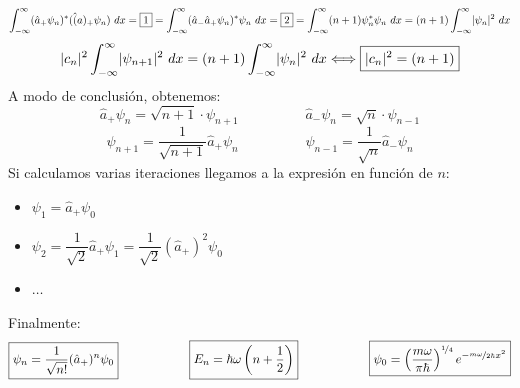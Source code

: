 \documentclass{report}
\begin{document}
      \[\int_{-\infty}^\infty (\hat{a}_+\psi_n)^*(\hat(a)_+\psi_n)\ dx=\boxed{1}=
      \int_{-\infty}^\infty (\hat{a}_-\hat{a}_+\psi_n)^*\psi_n\ dx=\boxed{2}=
      \int_{-\infty}^\infty (n+1)\psi_n^*\psi_n\ dx=(n+1)\int_{-\infty}^\infty \abs{\psi_n}^2\ dx\]
      \begin{equation}
        \lvert c_n\rvert^2\int_{-\infty}^\infty \lvert\psi_{n+1}\rvert^2\ dx=(n+1)\int_{-\infty}^{\infty}\lvert\psi_n\rvert^2\ dx \Longleftrightarrow \boxed{\lvert c_n\rvert^2=(n+1)}
      \end{equation}
      \noindent A modo de conclusión, obtenemos:
      \[\hat{a}_+\psi_n=\sqrt{n+1}\cdot\psi_{n+1}\hspace{2cm}\hat{a}_-\psi_n=\sqrt{n}\cdot\psi_{n-1}\]
      \[\psi_{n+1}=\dfrac{1}{\sqrt{n+1}}\hat{a}_+\psi_n\hspace{2cm}\psi_{n-1}=\dfrac{1}{\sqrt{n}}\hat{a}_-\psi_n\]
      \noindent Si calculamos varias iteraciones llegamos a la expresión en función de $n$:
      \begin{itemize}
        \item $\psi_1=\hat{a}_+\psi_0$
        \item $\psi_2=\dfrac{1}{\sqrt{2}}\hat{a}_+\psi_1=\dfrac{1}{\sqrt{2}}(\hat{a}_+)^2\psi_0$
        \item $\dots$
      \end{itemize}
      Finalmente:
      \begin{equation}
        \boxed{\psi_n=\dfrac{1}{\sqrt{n!}}(\hat{a}_+)^n\psi_0}\hspace{2cm}
        \boxed{E_n=\hbar\omega\left(n+\dfrac{1}{2}\right)}\hspace{2cm}
        \boxed{\psi_0=\left(\dfrac{m\omega}{\pi\hbar}\right)^{\nicefrac14} e^{-\nicefrac{m\omega}{2\hbar}x^2}}
      \end{equation}
\end{document}
